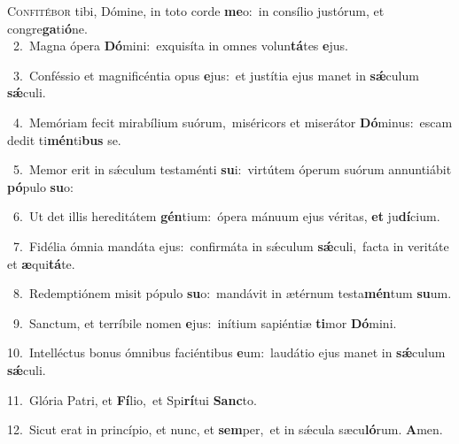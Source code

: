 \lettrine{\initial\textcolor{\initialcolor}{C}}{onfitébor} tibi, Dómine, in toto corde \textbf{me}\-o:~\star in consílio justórum, et congre\-\textbf{ga}\-ti\-\textbf{ó}\-ne.\\
{\numbfont\textcolor{\numbcolor}{~2.}}~Magna ópera \textbf{Dó}\-mini:~\star exquisíta in omnes volun\-\textbf{tá}\-tes \textbf{e}\-jus.\par
{\numbfont\textcolor{\numbcolor}{~3.}}~Conféssio et magnificéntia opus \textbf{e}\-jus:~\star et justítia ejus manet in \textbf{sǽ}\-culum \textbf{sǽ}\-culi.\par
{\numbfont\textcolor{\numbcolor}{~4.}}~Memóriam fecit mirabílium suórum,~\dagger miséricors et miserátor \textbf{Dó}\-minus:~\star escam dedit ti\-\textbf{mén}\-ti\textbf{bus} se.\par
{\numbfont\textcolor{\numbcolor}{~5.}}~Memor erit in sǽculum testaménti \textbf{su}\-i:~\star virtútem óperum suórum annuntiábit \textbf{pó}\-pulo \textbf{su}\-o:\par
{\numbfont\textcolor{\numbcolor}{~6.}}~Ut det illis hereditátem \textbf{gén}\-tium:~\star ópera mánuum ejus véritas, \textbf{et} ju\-\textbf{dí}\-cium.\par
{\numbfont\textcolor{\numbcolor}{~7.}}~Fidélia ómnia mandáta ejus:~\dagger confirmáta in sǽculum \textbf{sǽ}\-culi,~\star facta in veritáte et \textbf{æ}\-qui\-\textbf{tá}\-te.\par
{\numbfont\textcolor{\numbcolor}{~8.}}~Redemptiónem misit pópulo \textbf{su}\-o:~\star mandávit in ætérnum testa\-\textbf{mén}\-tum \textbf{su}\-um.\par
{\numbfont\textcolor{\numbcolor}{~9.}}~Sanctum, et terríbile nomen \textbf{e}\-jus:~\star inítium sapiéntiæ \textbf{ti}\-mor \textbf{Dó}\-mini.\par
{\numbfont\textcolor{\numbcolor}{10.}}~Intelléctus bonus ómnibus faciéntibus \textbf{e}\-um:~\star laudátio ejus manet in \textbf{sǽ}\-culum \textbf{sǽ}\-culi.\par
{\numbfont\textcolor{\numbcolor}{11.}}~Glória Patri, et \textbf{Fí}\-lio,~\star et Spi\-\textbf{rí}\-tui \textbf{Sanc}\-to.\par
{\numbfont\textcolor{\numbcolor}{12.}}~Sicut erat in princípio, et nunc, et \textbf{sem}\-per,~\star et in sǽcula sæcu\-\textbf{ló}\-rum. \textbf{A}\-men.\par
